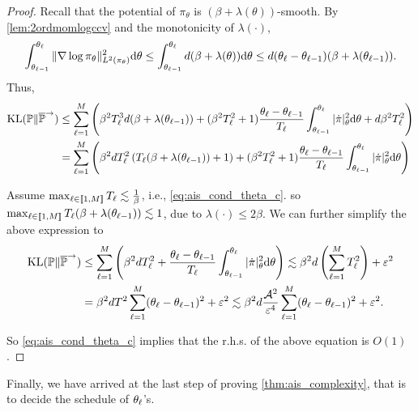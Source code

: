 \begin{proof}
    Recall that the potential of $\pi_\theta$ is $(\beta+\lambda(\theta))$-smooth. By \cref{lem:2ordmomlogccv} and the monotonicity of $\lambda(\cdot)$,
    $$\int_{\theta_{\ell-1}}^{\theta_\ell}\|\nabla\log\pi_\theta\|^2_{L^2(\pi_\theta)}\mathrm{d}\theta\le\int_{\theta_{\ell-1}}^{\theta_\ell}d(\beta+\lambda(\theta))\mathrm{d}\theta\le d(\theta_\ell-\theta_{\ell-1})(\beta+\lambda(\theta_{\ell-1})).$$
    Thus,
    \begin{align*}
        \operatorname{KL}(\mathbb{P}\|\overline{\mathbb{P}}^\to) & \le\sum_{\ell=1}^{M}\left(\beta^2T_\ell^3d(\beta+\lambda(\theta_{\ell-1}))+(\beta^2T_\ell^2+1)\frac{\theta_\ell-\theta_{\ell-1}}{T_\ell}\int_{\theta_{\ell-1}}^{\theta_\ell}|\dot\pi|_\theta^2\mathrm{d}\theta+d\beta^2T_\ell^2\right) \\
                      & =\sum_{\ell=1}^{M}\left(\beta^2dT_\ell^2\left(T_\ell(\beta+\lambda(\theta_{\ell-1}))+1\right)+(\beta^2T_\ell^2+1)\frac{\theta_\ell-\theta_{\ell-1}}{T_\ell}\int_{\theta_{\ell-1}}^{\theta_\ell}|\dot\pi|_\theta^2\mathrm{d}\theta\right)       \\
    \end{align*}

    Assume $\max_{\ell\in\left[\!\left[1,M\right]\!\right]}T_\ell\lesssim\frac{1}{\beta}$, i.e., \cref{eq:ais_cond_theta_c}. so $\max_{\ell\in\left[\!\left[1,M\right]\!\right]}T_\ell(\beta+\lambda(\theta_{\ell-1}))\lesssim1$, due to $\lambda(\cdot)\le2\beta$. We can further simplify the above expression to
    \begin{align*}
        \operatorname{KL}(\mathbb{P}\|\overline{\mathbb{P}}^\to) & \le\sum_{\ell=1}^{M}\left(\beta^2dT_\ell^2+\frac{\theta_\ell-\theta_{\ell-1}}{T_\ell}\int_{\theta_{\ell-1}}^{\theta_\ell}|\dot\pi|_\theta^2\mathrm{d}\theta\right)\lesssim \beta^2d\left(\sum_{\ell=1}^{M}T_\ell^2\right)+\varepsilon^2                                                                                 \\
                      & =\beta^2dT^2\sum_{\ell=1}^{M}(\theta_\ell-\theta_{\ell-1})^2+\varepsilon^2\lesssim\beta^2d\frac{\mathcal{A}^2}{\varepsilon^4}\sum_{\ell=1}^{M}(\theta_\ell-\theta_{\ell-1})^2+\varepsilon^2.
    \end{align*}

    So \cref{eq:ais_cond_theta_c} implies that the r.h.s. of the above equation is $O(1)$.
\end{proof}

Finally, we have arrived at the last step of proving \cref{thm:ais_complexity}, that is to decide the schedule of $\theta_\ell$'s.

